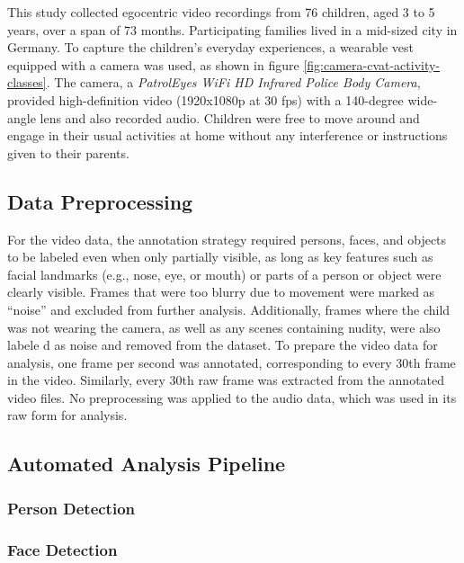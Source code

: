 \documentclass[
  man,floatsintext]{apa6}
\begin{document}
This study collected egocentric video recordings from 76 children, aged 3 to 5 years, over a span of 73 months. Participating families lived in a mid-sized city in Germany. To capture the children's everyday experiences, a wearable vest equipped with a camera was used, as shown in figure \ref{fig:camera-cvat-activity-classes}. The camera, a \emph{PatrolEyes WiFi HD Infrared Police Body Camera}, provided high-definition video (1920x1080p at 30 fps) with a 140-degree wide-angle lens and also recorded audio. Children were free to move around and engage in their usual activities at home without any interference or instructions given to their parents.

\subsection{Data Preprocessing}\label{data-preprocessing}

For the video data, the annotation strategy required persons, faces, and objects to be labeled even when only partially visible, as long as key features such as facial landmarks (e.g., nose, eye, or mouth) or parts of a person or object were clearly visible. Frames that were too blurry due to movement were marked as ``noise'' and excluded from further analysis. Additionally, frames where the child was not wearing the camera, as well as any scenes containing nudity, were also labele d as noise and removed from the dataset. To prepare the video data for analysis, one frame per second was annotated, corresponding to every 30th frame in the video. Similarly, every 30th raw frame was extracted from the annotated video files. No preprocessing was applied to the audio data, which was used in its raw form for analysis.

\subsection{Automated Analysis Pipeline}\label{automated-analysis-pipeline}

\subsubsection{Person Detection}\label{person-detection}

\subsubsection{Face Detection}\label{face-detection}
\end{document}
